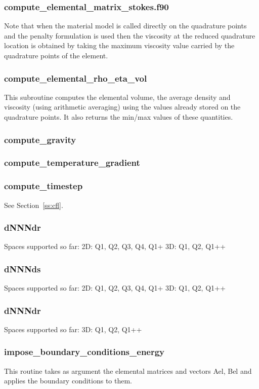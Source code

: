  \subsubsection{compute\_elemental\_matrix\_stokes.f90}
 Note that when the material model is called directly on the quadrature points and 
 the penalty formulation is used then the viscosity at the reduced quadrature location 
 is obtained by taking the maximum viscosity value carried by the quadrature points of 
 the element. 
 \subsubsection{compute\_elemental\_rho\_eta\_vol}
 This subroutine computes the elemental volume, the average density and 
 viscosity (using arithmetic averaging) using the values already stored on the quadrature points. 
 It also returns the min/max values of these quantities.
 \subsubsection{compute\_gravity}

 \subsubsection{compute\_temperature\_gradient}

 \subsubsection{compute\_timestep}
 See Section~\ref{ss:cfl}.
 \subsubsection{dNNNdr}
 Spaces supported so far:
 2D: Q1, Q2, Q3, Q4, Q1+
 3D: Q1, Q2, Q1++
 \subsubsection{dNNNds}
 Spaces supported so far:
 2D: Q1, Q2, Q3, Q4, Q1+
 3D: Q1, Q2, Q1++
 \subsubsection{dNNNdr}
 Spaces supported so far:
 3D: Q1, Q2, Q1++
 \subsubsection{impose\_boundary\_conditions\_energy}
 This routine takes as argument the elemental matrices and vectors Ael, Bel
 and applies the boundary conditions to them.
